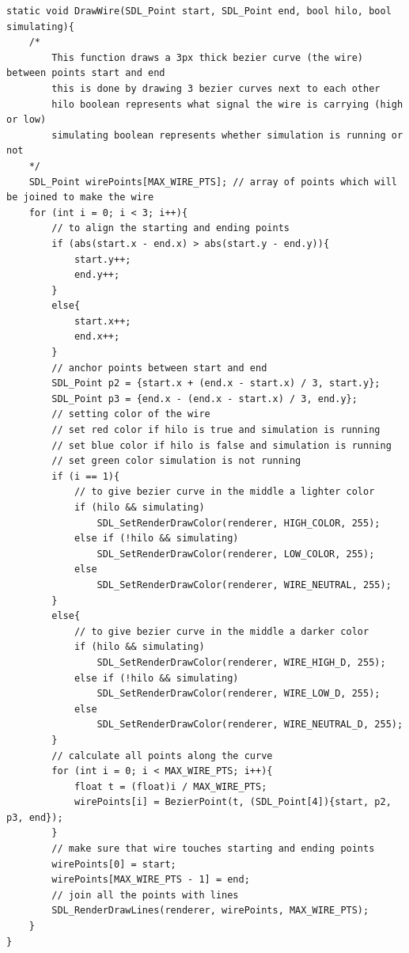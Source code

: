 \documentclass[report]{subfiles}
\begin{document}
\begin{lstlisting}
static void DrawWire(SDL_Point start, SDL_Point end, bool hilo, bool simulating){
    /*
        This function draws a 3px thick bezier curve (the wire) between points start and end
        this is done by drawing 3 bezier curves next to each other
        hilo boolean represents what signal the wire is carrying (high or low)
        simulating boolean represents whether simulation is running or not
    */
    SDL_Point wirePoints[MAX_WIRE_PTS]; // array of points which will be joined to make the wire
    for (int i = 0; i < 3; i++){
        // to align the starting and ending points
        if (abs(start.x - end.x) > abs(start.y - end.y)){
            start.y++;
            end.y++;
        }
        else{
            start.x++;
            end.x++;
        }
        // anchor points between start and end
        SDL_Point p2 = {start.x + (end.x - start.x) / 3, start.y};
        SDL_Point p3 = {end.x - (end.x - start.x) / 3, end.y};
        // setting color of the wire
        // set red color if hilo is true and simulation is running 
        // set blue color if hilo is false and simulation is running 
        // set green color simulation is not running 
        if (i == 1){
            // to give bezier curve in the middle a lighter color
            if (hilo && simulating)
                SDL_SetRenderDrawColor(renderer, HIGH_COLOR, 255);
            else if (!hilo && simulating)
                SDL_SetRenderDrawColor(renderer, LOW_COLOR, 255);
            else
                SDL_SetRenderDrawColor(renderer, WIRE_NEUTRAL, 255);
        }
        else{
            // to give bezier curve in the middle a darker color
            if (hilo && simulating)
                SDL_SetRenderDrawColor(renderer, WIRE_HIGH_D, 255);
            else if (!hilo && simulating)
                SDL_SetRenderDrawColor(renderer, WIRE_LOW_D, 255);
            else
                SDL_SetRenderDrawColor(renderer, WIRE_NEUTRAL_D, 255);
        }
        // calculate all points along the curve
        for (int i = 0; i < MAX_WIRE_PTS; i++){
            float t = (float)i / MAX_WIRE_PTS;
            wirePoints[i] = BezierPoint(t, (SDL_Point[4]){start, p2, p3, end});
        }
        // make sure that wire touches starting and ending points
        wirePoints[0] = start;
        wirePoints[MAX_WIRE_PTS - 1] = end;
        // join all the points with lines
        SDL_RenderDrawLines(renderer, wirePoints, MAX_WIRE_PTS);
    }
}
\end{lstlisting}
\end{document}
